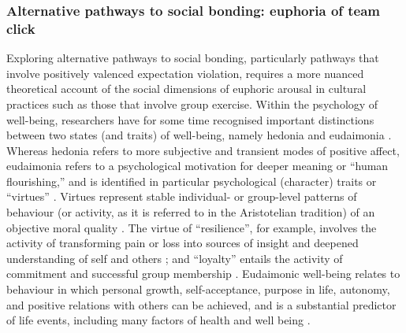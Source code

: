 \begin{mccorrection}
\subsubsection{Alternative pathways to social bonding: euphoria of team click}
Exploring alternative pathways to social bonding, particularly pathways that involve positively valenced expectation violation, requires a more nuanced theoretical account of the social dimensions of euphoric arousal in cultural practices such as those that involve group exercise.  Within the psychology of well-being, researchers have for some time recognised important distinctions between two states (and traits) of well-being, namely hedonia and eudaimonia \citep{Ryff1989}.  Whereas hedonia refers to more subjective and transient modes of positive affect, eudaimonia refers to a psychological motivation for deeper meaning or ``human flourishing,'' and is identified in particular psychological (character) traits or ``virtues'' \citep{Baumeister2013}.  Virtues represent stable individual- or group-level patterns of behaviour (or activity, as it is referred to in the Aristotelian tradition) of an objective moral quality \citep{Fowers2015}.
The virtue of ``resilience'', for example, involves the activity of transforming pain or loss into sources of insight and deepened understanding of self and others \citep{Ryff2015}; and ``loyalty'' entails the activity of commitment and successful group membership \citep{Fowers2015}.
Eudaimonic well-being relates to behaviour in which personal growth, self-acceptance, purpose in life, autonomy, and positive relations with others can be achieved, and is a substantial predictor of life events, including many factors of health and well being \citep{Ryff2004,Urry2004}.


\end{mccorrection}
